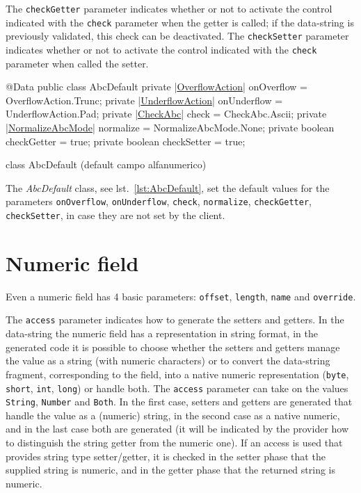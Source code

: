 The \hypertarget{abc:get}{\texttt{checkGetter}} parameter indicates whether or 
not to activate the control indicated with the \verb!check! parameter when the 
getter is called; if the data-string is previously validated, this check can be 
deactivated. 
The \hypertarget{abc:set}{\texttt{checkSetter}} parameter indicates whether or 
not to activate the control indicated with the \verb!check! parameter when 
called the setter.

\begin{elisting}[!htb]
\begin{javacode}
@Data
public class AbcDefault {
    private |\hyperref[lst:OverflowAction]{OverflowAction}| onOverflow = OverflowAction.Trunc;
    private |\hyperref[lst:UnderflowAction]{UnderflowAction}| onUnderflow = UnderflowAction.Pad;
    private |\hyperref[lst:CheckAbc]{CheckAbc}| check = CheckAbc.Ascii;
    private |\hyperref[lst:NormalizeAbcMode]{NormalizeAbcMode}| normalize = NormalizeAbcMode.None;
    private boolean checkGetter = true;
    private boolean checkSetter = true;
}
\end{javacode}
\caption{class AbcDefault (default campo alfanumerico)}
\label{lst:AbcDefault}
\end{elisting}

The \textsl{AbcDefault} class, see lst.~\ref{lst:AbcDefault}, set the default 
values for the parameters \verb!onOverflow!, \verb!onUnderflow!, \verb!check!, 
\verb!normalize!, \verb!checkGetter!, \verb!checkSetter!, in case they are not 
set by the client.

\section{Numeric field}\label{sec:spi.num}
Even a numeric field has 4 basic parameters: \verb!offset!, \verb!length!,
\verb!name! and \verb!override!.

The \verb!access! parameter indicates how to generate the setters and getters. 
In the data-string the numeric field has a representation in string format, in 
the generated code it is possible to choose whether the setters and getters 
manage the value as a string (with numeric characters) or to convert 
the data-string fragment, corresponding to the field, into a native numeric 
representation (\verb!byte!, \verb!short!, \verb!int!, \verb!long!) or 
handle both.
%
The \verb!access! parameter can take on the values \verb!String!, \verb!Number! 
and \verb!Both!. In the first case, setters and getters are generated that 
handle the value as a (numeric) string, in the second case as a native numeric, 
and in the last case both are generated (it will be indicated by the provider 
how to distinguish the string getter from the numeric one). 
If an access is used that provides string type setter/getter, it is checked in 
the setter phase that the supplied string is numeric, and in the getter phase 
that the returned string is numeric.

